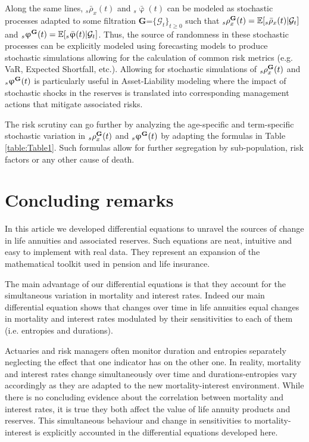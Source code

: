 \documentclass[12pt]{article}
\begin{document}
	
Along the same lines, ${}_s\bar{\rho}_x(t)$ and ${}_s\bar{\upvarphi}(t)$ can be modeled as stochastic processes adapted to some filtration \textbf{G}=$\{\mathcal{G}_t\}_{t\ge0}$ such that ${}_s{\rho}^{\bf{G}}_x(t)=\mathbb{E}[{}_s\bar{\rho}_x(t)|\mathcal{G}_t]$ and 
${}_s{\upvarphi}^{\bf{G}}(t)=\mathbb{E}[{}_s\bar{\upvarphi}(t)|\mathcal{G}_t]$. Thus, the source of randomness in these stochastic processes can be explicitly modeled using forecasting models to produce stochastic simulations allowing for the calculation of common risk metrics (e.g. VaR, Expected Shortfall, etc.). Allowing for stochastic simulations of ${}_s{\rho}^{\bf{G}}_x(t)$ and ${}_s{\upvarphi}^{\bf{G}}(t)$ is particularly useful in Asset-Liability modeling where the impact of stochastic shocks in the reserves is translated into corresponding management actions that mitigate associated risks.


The risk scrutiny can go further by analyzing the age-specific and term-specific stochastic variation in ${}_s{\rho}^{\bf{G}}_x(t)$ and ${}_s{\upvarphi}^{\bf{G}}(t)$ by adapting the formulas in Table \ref{table:Table1}. Such formulas allow for further segregation by sub-population, risk factors or any other cause of death.



\section{Concluding remarks}\label{sec:6_Conclusion}


In this article we developed differential equations to unravel the sources of change in life annuities and associated reserves. Such equations are neat, intuitive and easy to implement with real data. They represent an expansion of the mathematical toolkit used in pension and life insurance. 


 The main advantage of our differential equations is that they account for the simultaneous variation in mortality and interest rates. Indeed our main differential equation shows that changes over time in life annuities equal changes in mortality and interest rates modulated by their sensitivities to each of them (i.e. entropies and durations).

Actuaries and risk managers often monitor duration and entropies separately neglecting the effect that one indicator has on the other one. In reality, mortality and interest rates change simultaneously over time and durations-entropies vary accordingly as they are adapted to the new mortality-interest environment. While there is no concluding evidence about the correlation between mortality and interest rates, it is true they both affect the value of life annuity products and reserves. This simultaneous behaviour and change in sensitivities to mortality-interest is explicitly accounted in the differential equations developed here.
 
\end{document}
